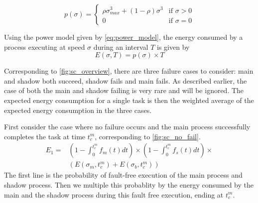 \begin{equation}
p(\sigma) = \begin{cases} \rho \sigma_{max}^3 + (1-\rho) \sigma^3 & \mbox{if } \sigma > 0 \\ 
                          0 & \mbox{if } \sigma = 0 \end{cases}
\label{eq:power_model}
\end{equation}

Using the power model given by \ref{eq:power_model}, the
energy consumed by a process executing at speed $\sigma$ during an
interval $T$ is given by
\begin{equation}
E(\sigma,T) = p(\sigma) \times T
\end{equation}


Corresponding to \ref{fig:sc_overview}, there are three
failure cases to consider: main and shadow both succeed, shadow fails
and main fails. As described earlier, the case of both the main and
shadow failing is very rare and will be ignored. The expected
energy consumption for a single task is then the weighted average of
the expected energy consumption in the three cases.


First consider the case where no failure occurs and the main process
successfully completes the task at time $t_c^m$, corresponding to
\ref{fig:sc_no_fail}.
\begin{equation}
\begin{split}
E_1 = &  ( 1-\int_0^{t_c^m}f_m(t)dt) \times (1 - \int_0^{t_c^m} f_s(t)dt) \times \\
      &  (  E(\sigma_m,t_c^m) + E(\sigma_b,t_c^m))
\label{eq:energy_no_failure}
\end{split}
\end{equation}
The first line is the probability of fault-free execution of the main
process and shadow process. Then we multiple this probablity by the
energy consumed by the main and the shadow process during this fault
free execution, ending at $t_c^m$.

